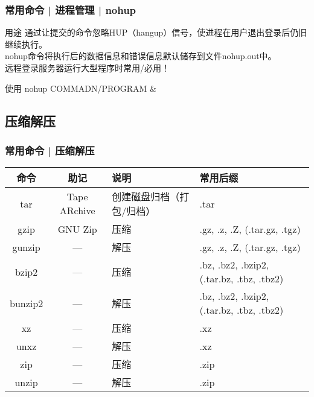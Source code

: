 \begin{frame}
  \frametitle{常用命令 | 进程管理 | \alert{nohup}}
  \begin{block}{用途}
    通过让提交的命令忽略HUP（hangup）信号，使进程在用户退出登录后仍旧继续执行。\\ nohup命令将执行后的数据信息和错误信息默认储存到文件nohup.out中。\\ \alert{远程登录服务器运行大型程序时常用/必用！}
  \end{block}
  \pause
  \begin{block}{使用}
    nohup COMMADN/PROGRAM \&
  \end{block}
\end{frame}

\subsection{压缩解压}
\begin{frame}
  \frametitle{常用命令 | \alert{压缩解压}}
  \begin{table}
    \centering
    \begin{tabularx}{\textwidth}{ccXX}
      \hline
      \rowcolor{blue!50}命令 & 助记 & 说明 & 常用后缀\\
      \hline
      tar & Tape ARchive & 创建磁盘归档（打包/归档） & .tar\\
      gzip & GNU Zip & 压缩 & .gz, .z, .Z, (.tar.gz, .tgz)\\
      gunzip & --- & 解压 & .gz, .z, .Z, (.tar.gz, .tgz)\\
      bzip2 & --- & 压缩 & .bz, .bz2, .bzip2, (.tar.bz, .tbz, .tbz2)\\
      bunzip2 & --- & 解压 & .bz, .bz2, .bzip2, (.tar.bz, .tbz, .tbz2)\\
      xz & --- & 压缩 & .xz\\
      unxz & --- & 解压 & .xz\\
      zip & --- & 压缩 & .zip\\
      unzip & --- & 解压 & .zip\\
      \hline
    \end{tabularx}
  \end{table}
\end{frame}

